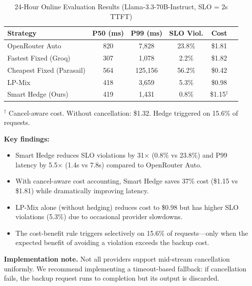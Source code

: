 \begin{table}[h]
\centering
\caption{24-Hour Online Evaluation Results (Llama-3.3-70B-Instruct, SLO = 2s TTFT)}
\label{tab:latency_full_results}
\begin{tabular}{lccccc}
\toprule
Strategy & P50 (ms) & P99 (ms) & SLO Viol. & Cost \\
\midrule
OpenRouter Auto & 820 & 7,828 & 23.8\% & \$1.81 \\
Fastest Fixed (Groq) & 307 & 1,078 & 2.2\% & \$1.82 \\
Cheapest Fixed (Parasail) & 564 & 125,156 & 56.2\% & \$0.42 \\
LP-Mix & 418 & 3,659 & 5.3\% & \$0.98 \\
Smart Hedge (Ours) & 419 & 1,431 & 0.8\% & \$1.15$^\dagger$ \\
\bottomrule
\end{tabular}
\vspace{0.5em}
\raggedright
\small{$^\dagger$ Cancel-aware cost. Without cancellation: \$1.32. Hedge triggered on 15.6\% of requests.}
\end{table}

\textbf{Key findings:}
\begin{itemize}
    \item Smart Hedge reduces SLO violations by 31$\times$ (0.8\% vs 23.8\%) and P99 latency by 5.5$\times$ (1.4s vs 7.8s) compared to OpenRouter Auto.
    \item With cancel-aware cost accounting, Smart Hedge saves 37\% cost (\$1.15 vs \$1.81) while dramatically improving latency.
    \item LP-Mix alone (without hedging) reduces cost to \$0.98 but has higher SLO violations (5.3\%) due to occasional provider slowdowns.
    \item The cost-benefit rule triggers selectively on 15.6\% of requests---only when the expected benefit of avoiding a violation exceeds the backup cost.
\end{itemize}

\textbf{Implementation note.} Not all providers support mid-stream cancellation uniformly. We recommend implementing a timeout-based fallback: if cancellation fails, the backup request runs to completion but its output is discarded.

